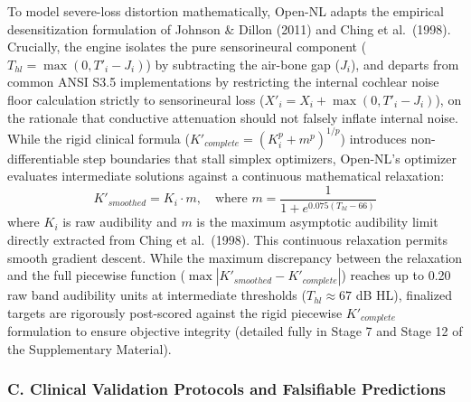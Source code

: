 \documentclass[
  12pt,
]{article}
\begin{document}
To model severe-loss distortion mathematically, Open-NL adapts the
empirical desensitization formulation of Johnson \& Dillon (2011) and
Ching et al.~(1998). Crucially, the engine isolates the pure
sensorineural component (\(T_{hl} = \max(0, T'_i - J_i)\)) by
subtracting the air-bone gap (\(J_i\)), and departs from common ANSI
S3.5 implementations by restricting the internal cochlear noise floor
calculation strictly to sensorineural loss
(\(X'_i = X_i + \max(0, T'_i - J_i)\)), on the rationale that conductive
attenuation should not falsely inflate internal noise. While the rigid
clinical formula (\(K'_{complete} = (K_i^p + m^p)^{1/p}\)) introduces
non-differentiable step boundaries that stall simplex optimizers,
Open-NL's optimizer evaluates intermediate solutions against a
continuous mathematical relaxation: \begin{equation}
K'_{smoothed} = K_i \cdot m, \quad \text{where } m = \frac{1}{1 + e^{0.075(T_{hl} - 66)}}
\end{equation} where \(K_i\) is raw audibility and \(m\) is the maximum
asymptotic audibility limit directly extracted from Ching et al.~(1998).
This continuous relaxation permits smooth gradient descent. While the
maximum discrepancy between the relaxation and the full piecewise
function (\(\max|K'_{smoothed} - K'_{complete}|\)) reaches up to 0.20
raw band audibility units at intermediate thresholds
(\(T_{hl} \approx 67\) dB HL), finalized targets are rigorously
post-scored against the rigid piecewise \(K'_{complete}\) formulation to
ensure objective integrity (detailed fully in Stage 7 and Stage 12 of
the Supplementary Material).

\subsubsection{C. Clinical Validation Protocols and Falsifiable
Predictions}\label{c.-clinical-validation-protocols-and-falsifiable-predictions}
\end{document}

